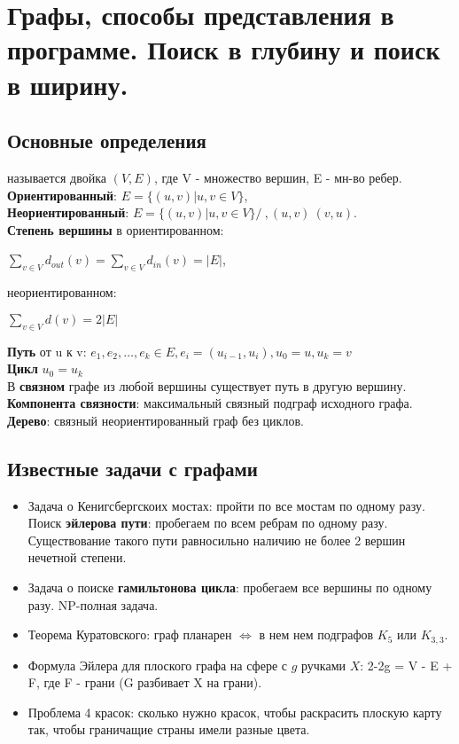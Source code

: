 \section {Графы, способы представления в программе. Поиск в глубину и поиск в ширину.}

\subsection* {Основные определения}

 называется двойка $(V, E)$, где V - множество вершин, E - мн-во ребер.\\
{\bf Ориентированный}: $E = \{(u,v) | u,v \in V\}$,\\
{\bf Неориентированный}: $E = \{(u,v) | u,v \in V\}/~, (u,v) ~ (v,u)$.\\
{\bf Степень вершины} в ориентированном:\begin{center} $\sum_{v\in V}d_{out}(v) = \sum_{v\in V}d_{in}(v) = |E|$, \end{center}
неориентированном: \begin{center} $\sum_{v\in V}d(v) = 2|E|$ \end{center}
{\bf Путь} от u к v: $e_1,e_2,\dots, e_k \in E, e_i = (u_{i-1}, u_i), u_0 = u, u_k = v$\\
{\bf Цикл}  $u_0 = u_k$\\
В {\bf связном} графе из любой вершины существует путь в другую вершину.\\
{\bf  Компонента связности}: максимальный связный подграф исходного графа.\\
{\bf Дерево}: связный неориентированный граф без циклов.


\subsection* {Известные задачи с графами}
\begin{itemize}
\item Задача о Кенигсбергскоих мостах: пройти по все мостам по одному разу. Поиск {\bf эйлерова пути}: пробегаем по всем ребрам по одному разу. Существование такого пути равносильно наличию не более 2 вершин нечетной степени.
\item Задача о поиске {\bf гамильтонова цикла}: пробегаем все вершины по одному разу. NP-полная задача.
\item Теорема Куратовского: граф планарен $\Leftrightarrow$ в нем нем подграфов $K_5$ или $K_{3,3}$.
\item Формула Эйлера для плоского графа на сфере с $g$ ручками $X$: 2-2g = V - E + F, где F - грани (G разбивает X на грани).
\item Проблема 4 красок: сколько нужно красок, чтобы раскрасить плоскую карту так, чтобы граничащие страны имели разные цвета.
\end{itemize}



